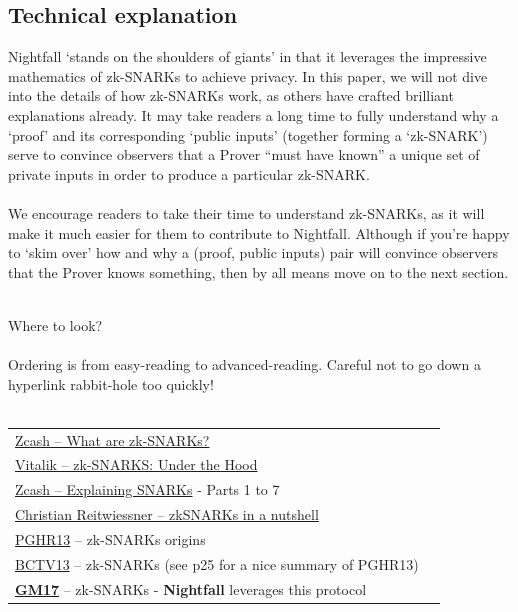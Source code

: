 \documentclass{article}
\begin{document}
\subsection{Technical explanation}
Nightfall `stands on the shoulders of giants' in that it leverages the impressive mathematics of zk-SNARKs to achieve privacy. In this paper, we will not dive into the details of how zk-SNARKs work, as others have crafted brilliant explanations already. It may take readers a long time to fully understand why a `proof' and its corresponding `public inputs' (together forming a `zk-SNARK') serve to convince observers that a Prover ``must have known'' a unique set of private inputs in order to produce a particular zk-SNARK.\\
\\
We encourage readers to take their time to understand zk-SNARKs, as it will make it much easier for them to contribute to Nightfall. Although if you're happy to `skim over' how and why a (proof, public inputs) pair will convince observers that the Prover knows something, then by all means move on to the next section.\\
\\
\begin{center}
  \begin{mdframed}[backgroundcolor=verylightblue]
    Where to look?\\
    \\
    Ordering is from easy-reading to advanced-reading. Careful not to go down a hyperlink rabbit-hole too quickly!\\
    \\
    \begin{tabular}{lp{14cm}}
      \href{https://z.cash/technology/zksnarks/}{Zcash -- What are zk-SNARKs?}\\
      \href{https://medium.com/@VitalikButerin/zk-snarks-under-the-hood-b33151a013f6}{Vitalik -- zk-SNARKS: Under the Hood}\\
      \href{https://z.cash/blog/snark-explain}{Zcash -- Explaining SNARKs} - Parts 1 to 7\\
      \href{https://blog.ethereum.org/2016/12/05/zksnarks-in-a-nutshell/}{Christian Reitwiessner -- zkSNARKs in a nutshell}\\
      \href{https://eprint.iacr.org/2013/279.pdf}{PGHR13} -- zk-SNARKs origins\\
      \href{https://eprint.iacr.org/2013/879.pdf}{BCTV13} -- zk-SNARKs (see p25 for a nice summary of PGHR13)\\
      \href{https://eprint.iacr.org/2017/540.pdf}{\textbf{GM17}} -- zk-SNARKs - \textbf{Nightfall} leverages this protocol
    \end{tabular}
  \end{mdframed}
\end{center}
\end{document}

